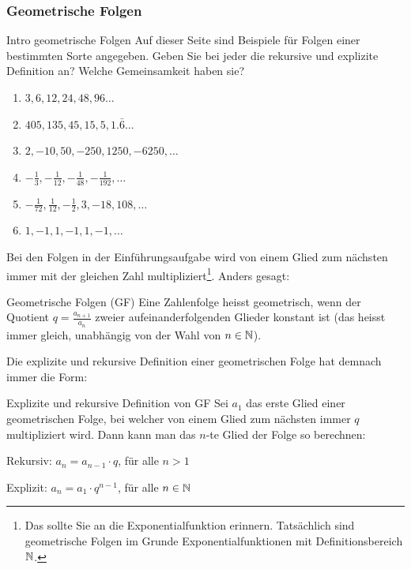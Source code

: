 \newpage
\subsubsection{Geometrische Folgen}
\begin{LA}{Intro geometrische Folgen}{}
    Auf dieser Seite sind Beispiele für Folgen einer bestimmten Sorte angegeben. Geben Sie bei jeder die rekursive und explizite Definition an? Welche Gemeinsamkeit haben sie?
\begin{enumerate}
    \item $3,6,12,24,48,96 \dots$
    \item $405,135,45,15,5,1.\bar{6} \dots$
    \item $2,-10,50,-250,1250,-6250,\dots$
    \item $-\frac{1}{3},-\frac{1}{12},-\frac{1}{48},-\frac{1}{192},\dots$
    \item $-\frac{1}{72},\frac{1}{12},-\frac{1}{2},3,-18,108,\dots$
    \item $1,-1,1,-1,1,-1, \dots$
\end{enumerate}
\end{LA}

\newpage
Bei den Folgen in der Einführungsaufgabe wird von einem Glied zum nächsten immer mit der gleichen Zahl multipliziert\footnote{Das sollte Sie an die Exponentialfunktion erinnern. Tatsächlich sind geometrische Folgen im Grunde Exponentialfunktionen mit Definitionsbereich $\mathbb{N}$.}. Anders gesagt: 

\begin{definition} {Geometrische Folgen (GF)} {}
    Eine Zahlenfolge heisst geometrisch, wenn der Quotient $q=\frac{a_{n+1}}{a_n}$ zweier aufeinanderfolgenden Glieder konstant ist
    (das heisst immer gleich, unabhängig von der Wahl von $n\in \mathbb{N}$).
\end{definition}
Die explizite und rekursive Definition einer geometrischen Folge hat demnach immer die Form:

\begin{satz} {Explizite und rekursive Definition von GF}{}
    Sei $a_1$ das erste Glied einer geometrischen Folge, bei welcher von einem Glied zum nächsten immer $q$ multipliziert wird. Dann kann man das $n$-te Glied der Folge so berechnen:
    
Rekursiv: $a_n=a_{n-1}\cdot q$, für alle $n>1$

Explizit: $a_n=a_1\cdot q^{n-1}$, für alle $n\in \mathbb{N}$
\end{satz}

